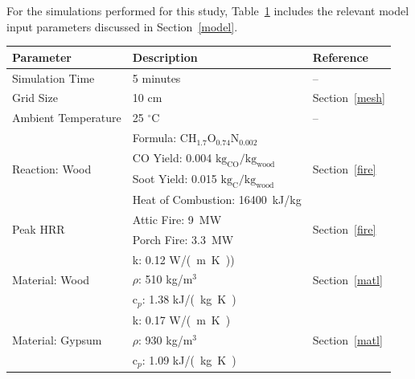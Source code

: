 \documentclass[11pt,oneside]{book}
\renewcommand{\C}{\mbox{C}}
\renewcommand{\H}{\mbox{H}}
\renewcommand{\O}{\mbox{O}}
\newcommand{\N}{\mbox{N}}
\begin{document}
For the simulations performed for this study, Table~\ref{tab:mod_param} includes the relevant model input parameters discussed in Section~\ref{model}.

\begin{table}
\centering
{}\label{tab:mod_param}
\begin{tabular}{lll}
\toprule[1.5pt]
Parameter & Description & Reference  \\
\midrule
 Simulation Time           & 5 minutes                             & -- \\[.25cm]
 Grid Size                 & 10 cm                                 & Section~\ref{mesh} \\ [.25cm]
 Ambient Temperature       & 25 $^{\circ}$C                        & -- \\ [.1cm]
\multirow{4}{*}{Reaction: Wood}  & Formula: $\C\H_{1.7}\O_{0.74}\N_{0.002}$              & \multirow{4}{*}{Section~\ref{fire}} \\
                           & CO Yield: 0.004 \; ${\mathrm{kg_{CO}}/\mathrm{kg_{wood}}}$  & \\
                           & Soot Yield: 0.015 \; ${\mathrm{kg_{C}}/\mathrm{kg_{wood}}}$ & \\
                           & Heat of Combustion: 16400~kJ/kg                             & \\ [.25cm]
\multirow{2}{*}{Peak HRR}  & Attic Fire: 9~MW                                            & \multirow{2}{*}{Section~\ref{fire}}\\ 
                           & Porch Fire: 3.3~MW                                          & \\ [.25cm]                     
\multirow{3}{*}{Material: Wood}    & k: 0.12 \; \si{W/(m.K)})        & \multirow{3}{*}{Section~\ref{matl}} \\
                                   & $\rho$: 510 \; kg/m$^3$         & \\
                                   & c$_{p}$: 1.38 \; \si{kJ/(kg.K)} & \\[.25cm]
\multirow{3}{*}{Material: Gypsum}  & k: 0.17 \; \si{W/(m.K)}         &  \multirow{3}{*}{Section~\ref{matl}}\\ 
                                   & $\rho$: 930 \; kg/m$^3$        & \\ 
                                   & c$_{p}$: 1.09 \; \si{kJ/(kg.K)} & \\
\bottomrule[1.25pt]
\end{tabular}\par
\end{table}
\end{document}
